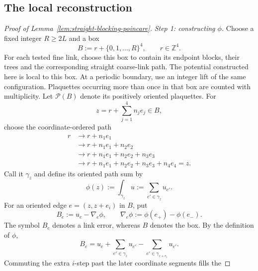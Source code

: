 \documentclass[10pt,reqno]{amsart}
\theoremstyle{definition}
\theoremstyle{remark}
\numberwithin{equation}{section}
\numberwithin{figure}{section}
\newcommand{\Z}{\mathbb Z}
\begin{document}
\subsection{The local reconstruction}
\begin{proof}[Proof of Lemma~\ref{lem:straight-blocking-poincare}]
\emph{Step 1: constructing $\phi$.}
Choose a fixed integer $R\ge2L$ and a box
\begin{equation}\label{eq:poincare-local-box}
B:=r+\{0,1,\ldots,R\}^4,\qquad r\in\Z^4.
\end{equation}
For each tested fine link, choose this box to contain its endpoint blocks,
their trees and the corresponding straight coarse-link path. The potential
constructed here is local to this box. At a periodic boundary, use an integer
lift of the same configuration. Plaquettes occurring more than once in that
box are counted with multiplicity.
Let $\mathcal P(B)$ denote its positively oriented plaquettes.
For
\begin{equation}\label{eq:poincare-site-coordinates}
z=r+\sum_{j=1}^4n_je_j\in B,
\end{equation}
choose the coordinate-ordered path
\begin{equation}\label{eq:poincare-coordinate-path}
\begin{aligned}
r&\longrightarrow r+n_1e_1\\
&\longrightarrow r+n_1e_1+n_2e_2\\
&\longrightarrow r+n_1e_1+n_2e_2+n_3e_3\\
&\longrightarrow r+n_1e_1+n_2e_2+n_3e_3+n_4e_4=z.
\end{aligned}
\end{equation}
Call it $\gamma_z$ and define its oriented path sum by
\begin{equation}\label{eq:poincare-potential}
\phi(z):=\int_{\gamma_z}u:=\sum_{e'\in\gamma_z}u_{e'}.
\end{equation}
For an oriented edge $e=(z,z+e_i)$ in $B$, put
\begin{equation}\label{eq:poincare-curl-error}
B_e:=u_e-\nabla_e\phi,\qquad
\nabla_e\phi:=\phi(e_+)-\phi(e_-).
\end{equation}
The symbol $B_e$ denotes a link error, whereas $B$ denotes the box.
By the definition of $\phi$,
\begin{equation}\label{eq:poincare-path-difference}
B_e=u_e+\sum_{e'\in\gamma_z}u_{e'}
-\sum_{e'\in\gamma_{z+e_i}}u_{e'}.
\end{equation}
Commuting the extra $i$-step past the later coordinate segments fills the

\end{proof}
\end{document}
